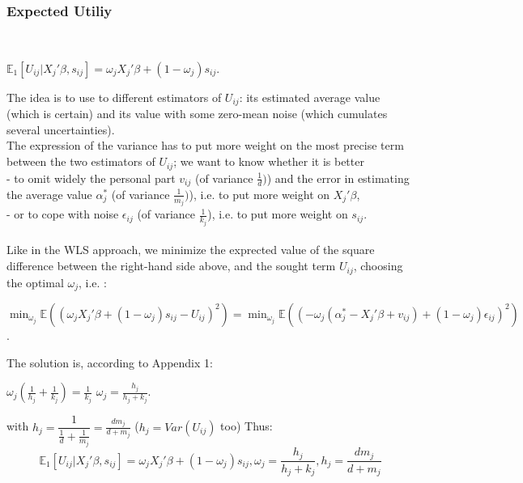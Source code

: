 	\subsubsection{Expected Utiliy}
	\\
	\begin{center}
		$\mathbb{E}_1[U_{i j}|X_{j}'\beta, s_{i j}]=\omega_{j} X_{j}'\beta+(1-\omega_{j})s_{i j}$.
	\end{center}
	The idea is to use to different estimators of $U_{i j}$: its estimated average value (which is certain) and its value with some zero-mean noise (which cumulates several uncertainties).\\
	The expression of the variance has to put more weight on the most precise term between the two estimators of $U_{i j}$; we want to know whether it is better \\
	- to omit widely the personal part $v_{i j}$ (of variance $\frac{1}{d})$) and the error in estimating the average value $\alpha_{j}^{*}$ (of variance $\frac{1}{m_{j}})$), i.e. to put more weight on $X_{j}'\beta$,\\
	- or to cope with noise $\epsilon_{i j}$ (of variance $\frac{1}{k_{j}}$), i.e. to put more weight on $s_{i j}$.\\
	\\
	Like in the WLS approach, we minimize the exprected value of the square difference between the right-hand side above, and the sought term $U_{i j}$, choosing the optimal $\omega_{j}$, i.e. :
	\begin{center}
		$\min_{\omega_{j}} \mathbb{E}((\omega_{j} X_{j}'\beta+(1-\omega_{j})s_{i j}-U_{i j})^{2})=\min_{\omega_{j}} \mathbb{E}((-\omega_{j} (\alpha_{j}^{*}-X_{j}'\beta+v_{i j})+(1-\omega_{j})\epsilon_{i j})^{2})$.
	\end{center}
	The solution is, according to Appendix 1:
	\begin{center}
		$\omega_{j}(\frac{1}{h_{j}}+\frac{1}{k_{j}})=\frac{1}{k_{j}}$
		$\omega_j=\frac{h_{j}}{h_{j}+k_{j}}$.
	\end{center}
	with $h_{j}=\dfrac{1}{\frac{1}{d}+\frac{1}{m_{j}}}=\frac{d m_{j}}{d+m_{j}}$ ($h_{j}=Var(U_{i j})$ too)
	Thus:
	\begin{equation}
	\mathbb{E}_1[U_{i j}|X_{j}'\beta, s_{i j}]=\omega_{j} X_{j}'\beta+(1-\omega_{j})s_{i j}, \omega_j=\frac{h_{j}}{h_{j}+k_{j}}, h_{j}=\frac{d m_{j}}{d+m_{j}}
	\end{equation}
	\\
